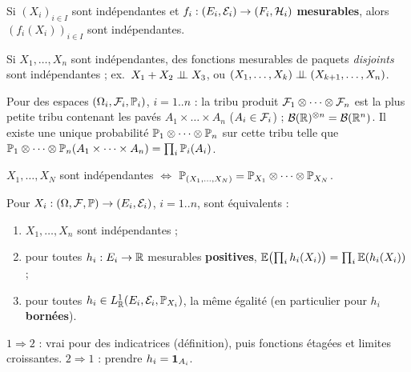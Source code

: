 \documentclass[11pt,a4paper]{article}
\begin{document}
\begin{lemme}\label{C3:fonctions}
Si $(X_i)_{i\in I}$ sont indépendantes et $f_i:(E_i,\mathcal{E}_i)\to(F_i,\mathcal{H}_i)$ \textbf{mesurables}, alors $(f_i(X_i))_{i\in I}$
sont indépendantes.
\end{lemme}

\begin{horscours}\label{C3:paquets}
Si $X_1,\dots,X_n$ sont indépendantes, des fonctions mesurables de paquets \emph{disjoints} sont indépendantes ;
ex.\ $X_1+X_2\perp\!\!\!\perp X_3$, ou $(X_1,\dots,X_k)\perp\!\!\!\perp(X_{k+1},\dots,X_n)$.
\end{horscours}

\begin{theoreme}\label{C3:produit}
Pour des espaces $(\Omega_i,\mathcal{F}_i,\mathbb{P}_i)$, $i=1..n$ : la tribu produit $\mathcal{F}_1\otimes\dots\otimes\mathcal{F}_n$ est la plus petite tribu
contenant les pavés $A_1\times\dots\times A_n$ ($A_i\in\mathcal{F}_i$) ; $\mathcal{B}(\mathbb{R})^{\otimes n}=\mathcal{B}(\mathbb{R}^n)$. Il existe une unique probabilité
$\mathbb{P}_1\otimes\dots\otimes\mathbb{P}_n$ sur cette tribu telle que $\mathbb{P}_1\otimes\dots\otimes\mathbb{P}_n(A_1\times\dots\times A_n)=\prod_i\mathbb{P}_i(A_i)$.
\end{theoreme}

\begin{lemme}\label{C3:loi-jointe}
$X_1,\dots,X_N$ sont indépendantes $\iff$ $\mathbb{P}_{(X_1,\dots,X_N)}=\mathbb{P}_{X_1}\otimes\dots\otimes\mathbb{P}_{X_N}$.
\end{lemme}

\begin{theoreme}\label{C3:esp-produit}
Pour $X_i:(\Omega,\mathcal{F},\mathbb{P})\to(E_i,\mathcal{E}_i)$, $i=1..n$, sont équivalents :
\begin{enumerate}
  \item $X_1,\dots,X_n$ sont indépendantes ;
  \item pour toutes $h_i:E_i\to\mathbb{R}$ mesurables \textbf{positives}, $\mathbb{E}\bigl(\prod_i h_i(X_i)\bigr)=\prod_i\mathbb{E}(h_i(X_i))$ ;
  \item pour toutes $h_i\in L^1_{\mathbb{R}}(E_i,\mathcal{E}_i,\mathbb{P}_{X_i})$, la même égalité (en particulier pour $h_i$ \textbf{bornées}).
\end{enumerate}
\end{theoreme}
\begin{idee}
$1\Rightarrow2$ : vrai pour des indicatrices (définition), puis fonctions étagées et limites croissantes.
$2\Rightarrow1$ : prendre $h_i=\mathbf{1}_{A_i}$.
\end{idee}
\end{document}

